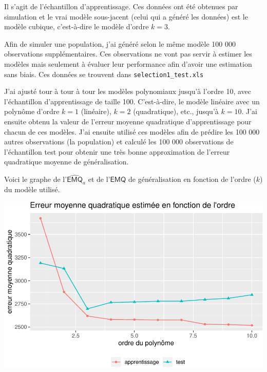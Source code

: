 \documentclass[
  11pt,
  letterpaper,
]{book}
\theoremstyle{definition}
\theoremstyle{definition}
\theoremstyle{definition}
\theoremstyle{remark}
\begin{document}
Il s'agit de l'échantillon d'apprentissage. Ces données ont été obtenues par simulation et le vrai modèle sous-jacent (celui qui a généré les données) est le modèle cubique, c'est-à-dire le modèle d'ordre \(k=3\).

Afin de simuler une population, j'ai généré selon le même modèle 100 000 observations supplémentaires. Ces observations ne vont pas servir à estimer les modèles mais seulement à évaluer leur performance afin d'avoir une estimation sans biais. Ces données se trouvent dans \texttt{selection1\_test.xls}

J'ai ajusté tour à tour à tour les modèles polynomiaux jusqu'à l'ordre 10, avec l'échantillon d'apprentissage de taille 100. C'est-à-dire, le modèle linéaire avec un polynôme d'ordre \(k=1\) (linéaire), \(k=2\) (quadratique), etc., jusqu'à \(k=10\). J'ai ensuite obtenu la valeur de l'erreur moyenne quadratique d'apprentissage pour chacun de ces modèles. J'ai ensuite utilisé ces modèles afin de prédire les 100 000 autres observations (la population) et calculé les 100 000 observations de l'échantillon test pour obtenir une très bonne approximation de l'erreur quadratique moyenne de généralisation.

Voici le graphe de l'\(\widehat{\mathsf{EMQ}}_a\) et de l'\(\mathsf{EMQ}\) de généralisation en fonction de l'ordre (\(k\)) du modèle utilisé.

\begin{center}\includegraphics[width=0.7\linewidth]{MATH60602_files/figure-latex/02-plotEMQa-1} \end{center}
\end{document}

